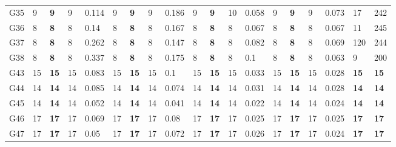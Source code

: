 \documentclass[12pt, a4paper]{article}%
\numberwithin{equation}{section}
\theoremstyle{plain}
\begin{document}
{\begin{landscape}
\begin{longtable}{lllllllllllllllllll}
						G35                                           & 9    & \textbf{9}  & 9   & 0.114 & 9    & \textbf{9}  & 9   & 0.186 & 9    & \textbf{9}  & 10  & 0.058 & 9    & \textbf{9}  & 9   & 0.073 & 17                                          & 242                                      \\
						G36                                           & 8    & \textbf{8}  & 8   & 0.14  & 8    & \textbf{8}  & 8   & 0.167 & 8    & \textbf{8}  & 8   & 0.067 & 8    & \textbf{8}  & 8   & 0.067 & 11                                          & 245                                      \\
						G37                                           & 8    & \textbf{8}  & 8   & 0.262 & 8    & \textbf{8}  & 8   & 0.147 & 8    & \textbf{8}  & 8   & 0.082 & 8    & \textbf{8}  & 8   & 0.069 & 120                                         & 244                                      \\
						G38                                           & 8    & \textbf{8}  & 8   & 0.337 & 8    & \textbf{8}  & 8   & 0.175 & 8    & \textbf{8}  & 8   & 0.1   & 8    & \textbf{8}  & 8   & 0.063 & 9                                           & 200                                      \\
						G43                                           & 15   & \textbf{15} & 15  & 0.083 & 15   & \textbf{15} & 15  & 0.1   & 15   & \textbf{15} & 15  & 0.033 & 15   & \textbf{15} & 15  & 0.028 & \textbf{15}                                 & \textbf{15}                              \\
						G44                                           & 14   & \textbf{14} & 14  & 0.085 & 14   & \textbf{14} & 14  & 0.074 & 14   & \textbf{14} & 14  & 0.031 & 14   & \textbf{14} & 14  & 0.028 & \textbf{14}                                 & \textbf{14}                              \\
						G45                                           & 14   & \textbf{14} & 14  & 0.052 & 14   & \textbf{14} & 14  & 0.041 & 14   & \textbf{14} & 14  & 0.022 & 14   & \textbf{14} & 14  & 0.024 & \textbf{14}                                 & \textbf{14}                              \\
						G46                                           & 17   & \textbf{17} & 17  & 0.069 & 17   & \textbf{17} & 17  & 0.08  & 17   & \textbf{17} & 17  & 0.025 & 17   & \textbf{17} & 17  & 0.025 & \textbf{17}                                 & \textbf{17}                              \\
						G47                                           & 17   & \textbf{17} & 17  & 0.05  & 17   & \textbf{17} & 17  & 0.072 & 17   & \textbf{17} & 17  & 0.026 & 17   & \textbf{17} & 17  & 0.024 & \textbf{17}                                 & \textbf{17}                              \\

\end{longtable}
\end{landscape}}
\end{document}
